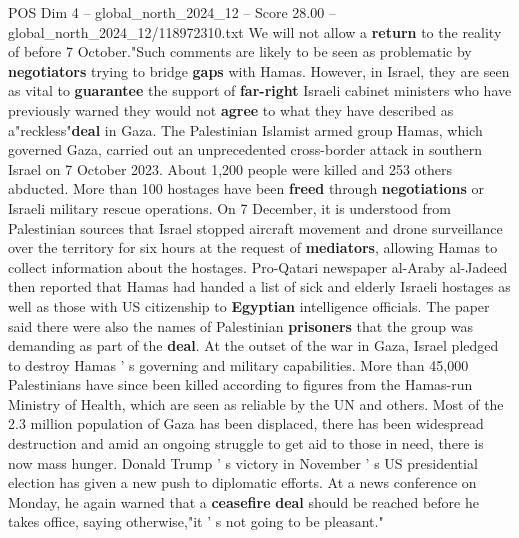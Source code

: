 \begin{textsample}{POS Dim 4 – global\_north\_2024\_12 – Score 28.00 – global\_north\_2024\_12/118972310.txt}
We will not allow a \textbf{return} to the reality of before 7 October."Such comments are likely to be seen as problematic by \textbf{negotiators} trying to bridge \textbf{gaps} with Hamas.
However, in Israel, they are seen as vital to \textbf{guarantee} the support of \textbf{far-right} Israeli cabinet ministers who have previously warned they would not \textbf{agree} to what they have described as a"reckless"\textbf{deal} in Gaza.
The Palestinian Islamist armed group Hamas, which governed Gaza, carried out an unprecedented cross-border attack in southern Israel on 7 October 2023.
About 1,200 people were killed and 253 others abducted.
More than 100 hostages have been \textbf{freed} through \textbf{negotiations} or Israeli military rescue operations.
On 7 December, it is understood from Palestinian sources that Israel stopped aircraft movement and drone surveillance over the territory for six hours at the request of \textbf{mediators}, allowing Hamas to collect information about the hostages.
Pro-Qatari newspaper al-Araby al-Jadeed then reported that Hamas had handed a list of sick and elderly Israeli hostages as well as those with US citizenship to \textbf{Egyptian} intelligence officials.
The paper said there were also the names of Palestinian \textbf{prisoners} that the group was demanding as part of the \textbf{deal}.
At the outset of the war in Gaza, Israel pledged to destroy Hamas ' s governing and military capabilities.
More than 45,000 Palestinians have since been killed according to figures from the Hamas-run Ministry of Health, which are seen as reliable by the UN and others.
Most of the 2.3 million population of Gaza has been displaced, there has been widespread destruction and amid an ongoing struggle to get aid to those in need, there is now mass hunger.
Donald Trump ' s victory in November ' s US presidential election has given a new push to diplomatic efforts.
At a news conference on Monday, he again warned that a \textbf{ceasefire} \textbf{deal} should be reached before he takes office, saying otherwise,"it ' s not going to be pleasant."

\end{textsample}
